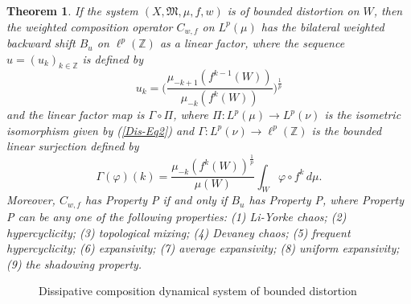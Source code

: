 \documentclass[12pt]{article}
\theoremstyle{plain}
\newtheorem{theorem}{Theorem}%
\theoremstyle{definition}
\newcommand{\Z}{\mathbb{Z}} %
\newcommand{\fM}{\mathfrak{M}}
\begin{document}
\begin{theorem}\label{Dis-T5}
If the system $(X,\fM,\mu, f, w)$ is of bounded distortion on $W$, then the weighted composition operator $C_{w,f}$ on $L^p(\mu)$ 
has the bilateral weighted backward shift $B_u$ on $\ell^p(\Z)$ as a linear factor, where the sequence $u = (u_k)_{k \in \Z}$ is defined by
\[
u_k = \Big(\frac{\mu_{-k+1}(f^{k-1}(W))}{\mu_{-k}(f^k(W))}\Big)^\frac{1}{p}
\]
and the linear factor map is $\Gamma \circ \Pi$, where $\Pi : L^p(\mu) \to L^p(\nu)$ is the isometric isomorphism 
given by (\ref{Dis-Eq2}) and $\Gamma : L^p(\nu) \to \ell^p(\Z)$ is the bounded linear surjection defined by
\[
\Gamma(\varphi)(k) = \frac{\mu_{-k}(f^k(W))^\frac{1}{p}}{\mu(W)} \int_W \varphi \circ f^k\, d\mu.
\]
Moreover, $C_{w,f}$ has Property P if and only if $B_u$ has Property P, where Property P can be any one of the following properties: 
(1) Li-Yorke chaos; (2) hypercyclicity; (3) topological mixing; (4) Devaney chaos; (5) frequent hypercyclicity; 
(6) expansivity; (7) average expansivity; (8) uniform expansivity; (9) the shadowing property.
\end{theorem}

\begin{figure}[h]
\centering
\caption{Dissipative composition dynamical system of bounded distortion }
\end{figure}
\end{document}

